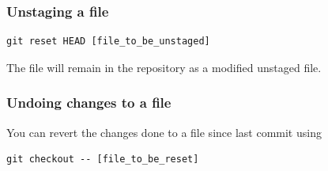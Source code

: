 \documentclass[12p,a4paper]{article}
\begin{document}
\subsubsection{Unstaging a file}
\begin{verbatim}
git reset HEAD [file_to_be_unstaged]
\end{verbatim}
The file will remain in the repository as a modified unstaged file.


\subsubsection{Undoing changes to a file}
You can revert the changes done to a file since last commit using
\begin{verbatim}
git checkout -- [file_to_be_reset]
\end{verbatim}
\end{document}
